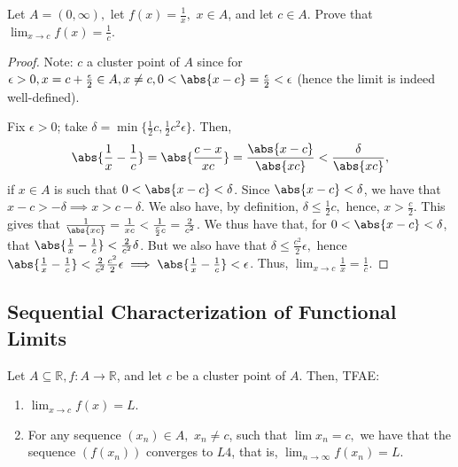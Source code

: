 \documentclass[12pt]{article}
\begin{document}
\begin{example}
  Let $A = (0, \infty),$ let $f(x) = \frac{1}{x},$ $x \in A$, and let $c \in A$. Prove that $\lim_{x\to c} f(x) = \frac{1}{c}$.
  \begin{proof}
    Note: $c$ a cluster point of $A$ since for $\epsilon > 0, x = c + \frac{\epsilon}{2} \in A, x \neq c, 0 < \abs{x - c} = \frac{\epsilon}{2} < \epsilon$ (hence the limit is indeed well-defined).

    Fix $\epsilon > 0$; take $\delta = \min \{\frac{1}{2}c, \frac{1}{2}c^2\epsilon\}$. Then, \begin{align*}
      \abs{\frac{1}{x} - \frac{1}{c}} = \abs{\frac{c-x}{xc}} = \frac{\abs{x - c}}{\abs{xc}}< \frac{\delta}{\abs{xc}},
    \end{align*}
    if $x \in A$ is such that $0 < \abs{x - c} < \delta$. Since $\abs{x - c} < \delta$, we have that $x -c > - \delta \implies x > c - \delta$. We also have, by definition, $\delta \leq \frac{1}{2} c,$ hence, $x > \frac{c}{2}$. This gives that $\frac{1}{\abs{xc}} = \frac{1}{xc} < \frac{1}{\frac{c}{2}c} = \frac{2}{c^2}$. We thus have that, for $0 < \abs{x - c} < \delta$, that $\abs{\frac{1}{x} - \frac{1}{c}} < \frac{2}{c^2}\delta$. But we also have that $\delta \leq \frac{c^2}{2}\epsilon,$ hence $\abs{\frac{1}{x} - \frac{1}{c}}< \frac{2}{c^2} \frac{c^2}{2}\epsilon \implies \abs{\frac{1}{x} - \frac{1}{c}} < \epsilon$. Thus, $\lim_{x\to c} \frac{1}{x} = \frac{1}{c}$.
  \end{proof}
\end{example}

\subsection{Sequential Characterization of Functional Limits}

\begin{theorem}\label{thm:sequentialfunctionallimit}
  Let $A \subseteq \mathbb{R}, f : A \to \mathbb{R}$, and let $c$ be a cluster point of $A$. Then, TFAE:
  \begin{enumerate}
    \item $\lim_{x\to c}f(x) = L$.
    \item For any sequence $(x_n) \in A,$ $x_n \neq c$, such that $\lim x_n = c,$ we have that the sequence $(f(x_n))$ converges to $L4$, that is, $\lim_{n\to\infty} f(x_n) = L$.
  \end{enumerate}
\end{theorem}
\end{document}
